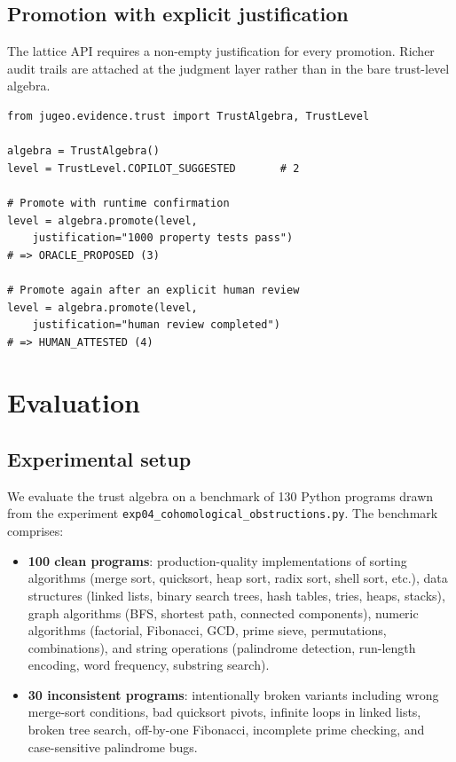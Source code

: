 \documentclass[11pt]{article}
\begin{document}
\subsection{Promotion with explicit justification}\label{sec:api-promo-log}

The lattice API requires a non-empty justification for every promotion.
Richer audit trails are attached at the judgment layer rather than in the
bare trust-level algebra.

\begin{lstlisting}[caption={Promotion with audit trail.},
                   label=lst:promo-audit]
from jugeo.evidence.trust import TrustAlgebra, TrustLevel

algebra = TrustAlgebra()
level = TrustLevel.COPILOT_SUGGESTED       # 2

# Promote with runtime confirmation
level = algebra.promote(level,
    justification="1000 property tests pass")
# => ORACLE_PROPOSED (3)

# Promote again after an explicit human review
level = algebra.promote(level,
    justification="human review completed")
# => HUMAN_ATTESTED (4)
\end{lstlisting}


\section{Evaluation}\label{sec:eval}

\subsection{Experimental setup}\label{sec:eval-setup}

We evaluate the trust algebra on a benchmark of 130 Python
programs drawn from the experiment
\texttt{exp04\_cohomological\_obstructions.py}.
The benchmark comprises:

\begin{itemize}[nosep]
  \item \textbf{100 clean programs}: production-quality
        implementations of sorting algorithms (merge sort,
        quicksort, heap sort, radix sort, shell sort, etc.),
        data structures (linked lists, binary search trees,
        hash tables, tries, heaps, stacks), graph algorithms
        (BFS, shortest path, connected components), numeric
        algorithms (factorial, Fibonacci, GCD, prime sieve,
        permutations, combinations), and string operations
        (palindrome detection, run-length encoding, word
        frequency, substring search).
  \item \textbf{30 inconsistent programs}: intentionally broken
        variants including wrong merge-sort conditions,
        bad quicksort pivots, infinite loops in linked lists,
        broken tree search, off-by-one Fibonacci,
        incomplete prime checking, and case-sensitive
        palindrome bugs.
\end{itemize}
\end{document}

